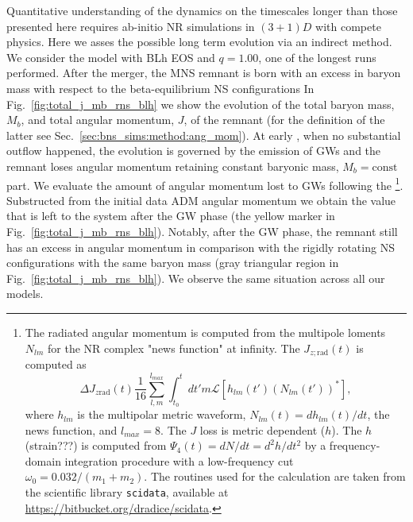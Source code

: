 Quantitative understanding of the \pmerg{} dynamics on the timescales 
longer than those presented here requires ab-initio \ac{NR} simulations in 
$(3+1)D$ with compete physics.
%
Here we asses the possible long term evolution via an indirect method.
We consider the model with BLh \ac{EOS} and $q=1.00$, one of the longest runs 
performed. 
%
After the merger, the \ac{MNS} remnant is born with an excess in baryon mass
with respect to the beta-equilibrium \ac{NS} configurations
%
In Fig.~\ref{fig:total_j_mb_rns_blh} we show the evolution of the 
total baryon mass, $M_b$, and total angular momentum, $J$, of the remnant
(for the definition of the latter see Sec.~\ref{sec:bns_sims:method:ang_mom}).
%
At early \pmerg{}, when no substantial outflow happened, the 
evolution is governed by the emission of \acp{GW} and the remnant loses 
angular momentum retaining constant baryonic mass, $M_b=\text{const}$ part.
%
We evaluate the amount of angular momentum lost to \acp{GW} following the 
\citet{Damour:2011fu,Bernuzzi:2012ci,Bernuzzi:2015rla}\footnote{
    The radiated angular momentum is computed from the 
    multipole loments $N_{lm}$ for the \ac{NR} complex "news function" at infinity. 
    The $J_{z;\text{rad}}(t)$ is computed as \citep{Damour:2011fu} 
    \begin{equation*}
    \Delta J_{z\text{rad}}(t) \frac{1}{16}\sum_{l,m}^{l_{max}}\int_{t_0}^{t} dt' m \mathcal{L}[h_{lm}(t')(N_{lm}(t'))^*],
    \end{equation*}
    where $h_{lm}$ is the multipolar metric waveform, 
    $N_{lm}(t) = dh_{lm}(t) / dt$, the news function, and $l_{max}=8$.
    The $J$ loss is metric dependent ($h$).
    The $h$ (strain???) is computed from $\Psi_4(t) = dN/dt = d^2h/dt^2$ by a 
    frequency-domain integration procedure with a low-frequency cut 
    $\omega_0 = 0.032/(m_1+m_2)$.
    The routines used for the calculation are taken from the scientific library
    \texttt{scidata}, available at \url{https://bitbucket.org/dradice/scidata}.
}.
%
Substructed from the initial data \ac{ADM} angular momentum  
we obtain the value that is left to the system after the \ac{GW} phase 
(the yellow marker in Fig.~\ref{fig:total_j_mb_rns_blh}).
%
Notably, after the \ac{GW} phase, the remnant still has an excess in angular momentum
in comparison with the rigidly rotating \ac{NS} configurations with the same baryon mass 
(gray triangular region in Fig.~\ref{fig:total_j_mb_rns_blh}).
%
We observe the same situation across all our models.%


